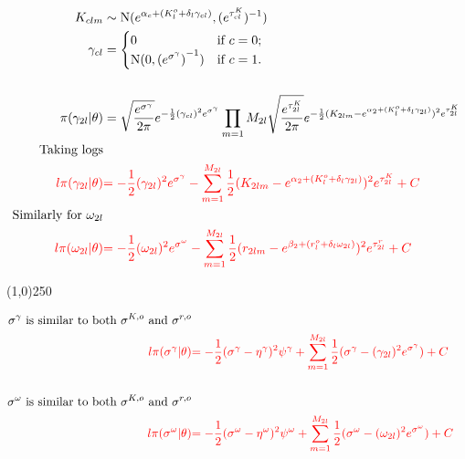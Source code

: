 \begin{align*}
K_{clm} &\sim \operatorname{N}(e^{\alpha_{c}+(K_{l}^o+\delta_{l}\gamma_{cl})},(e^{ \tau_{cl}^K })^{-1})\\
\gamma_{cl}&=\begin{cases}
0  & \text{if } c=0;\\
\operatorname{N}(0,{(e^{\sigma^{\gamma}})}^{-1}) & \text{if } c=1.
\end{cases}\\
\\
\pi(\gamma_{2l}|\theta)&=\sqrt{\frac{e^{\sigma^{\gamma}}}{2\pi}} e^{-\frac{1}{2}(\gamma_{cl})^{2}e^{\sigma^{\gamma}} }
\prod_{m=1}{M_{2l}}
\sqrt{\frac{e^{ \tau_{2l}^K }}{2\pi}} e^{-\frac{1}{2}(K_{2lm}-e^{\alpha_{2}+(K_{l}^o+\delta_{l}\gamma_{2l})})^{2} e^{ \tau_{2l}^K }}\\
\text{Taking logs}\\
\color{red}{l\pi(\gamma_{2l}|\theta)}&
\color{red}{
=-\frac{1}{2}(\gamma_{2l})^{2}e^{\sigma^{\gamma}}
-
\sum_{m=1}^{M_{2l}}\frac{1}{2}(K_{2lm}-e^{\alpha_{2}+(K_{l}^o+\delta_{l}\gamma_{2l})})^{2}e^{\tau_{2l}^K}
+C
}\\
\text{Similarly for $\omega_{2l}$}\\
\color{red}{l\pi(\omega_{2l}|\theta)}&
\color{red}{
=-\frac{1}{2}(\omega_{2l})^{2}e^{\sigma^{\omega}}
-
\sum_{m=1}^{M_{2l}}\frac{1}{2}(r_{2lm}-e^{\beta_{2}+(r_{l}^o+\delta_{l}\omega_{2l})})^{2}e^{\tau_{2l}^r}
+C
}
\end{align*}

\begin{center}
\line(1,0){250}
\end{center}

\begin{align*}
\text{$\sigma^{\gamma}$ is similar to both $\sigma^{K,o}$ and $\sigma^{r,o}$}\\
\color{red}{l\pi(\sigma^{\gamma}|\theta)}&
\color{red}{
=-\frac{1}{2}(\sigma^{\gamma}-\eta^{\gamma})^{2}\psi^{\gamma} 
+
\sum_{m=1}^{M_{2l}}\frac{1}{2}(\sigma^{\gamma}-(\gamma_{2l})^{2}e^{\sigma^{\gamma}})
+C
}\\
\\
\text{$\sigma^{\omega}$ is similar to both $\sigma^{K,o}$ and $\sigma^{r,o}$}\\
\color{red}{l\pi(\sigma^{\omega}|\theta)}&
\color{red}{
=-\frac{1}{2}(\sigma^{\omega}-\eta^{\omega})^{2}\psi^{\omega} 
+
\sum_{m=1}^{M_{2l}}\frac{1}{2}(\sigma^{\omega}-(\omega_{2l})^{2}e^{\sigma^{\omega}})
+C
}
\end{align*}

